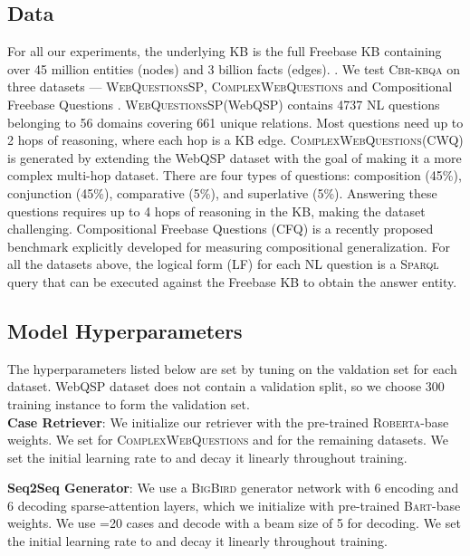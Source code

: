 \documentclass{article}
\newcommand{\roberta}{\textsc{Roberta}\xspace}
\newcommand{\bigb}{\textsc{BigBird}\xspace}
\newcommand{\webqsp}{\textsc{WebQuestionsSP}\xspace}
\newcommand{\cwq}{\textsc{ComplexWebQuestions}\xspace}
\newcommand{\alg}{\textsc{Cbr-kbqa}\xspace}
\begin{document}
\subsection{Data}
For all our experiments, the underlying KB is the full Freebase KB containing over 45 million entities (nodes) and 3 billion facts (edges). \cite{fb}. We test \alg on three datasets --- \webqsp \cite{yih2016value}, \cwq \cite{Talmor2018TheWA} and Compositional Freebase Questions \cite{keysers2020measuring}. \webqsp (WebQSP) contains 4737 NL questions belonging to 56 domains covering 661 unique relations. Most questions need up to 2 hops of reasoning, where each hop is a KB edge. \cwq (CWQ) is generated by extending the WebQSP dataset with the goal of making it a more complex multi-hop dataset. There are four types of questions: composition (45\%), conjunction (45\%), comparative (5\%), and superlative (5\%). Answering these questions requires up to 4 hops of reasoning in the KB, making the dataset challenging. Compositional Freebase Questions (CFQ) is a recently proposed benchmark explicitly developed for measuring compositional generalization. For all the datasets above, the logical form (LF) for each NL question is a \textsc{Sparql} query that can be executed against the Freebase KB to obtain the answer entity.


\subsection{Model Hyperparameters}
The hyperparameters listed below are set by tuning on the valdation set for each dataset. WebQSP dataset does not contain a validation split, so we choose 300 training instance to form the validation set.\\
\textbf{Case Retriever}: We initialize our retriever with the pre-trained \roberta-base weights. We set  for \cwq and  for the remaining datasets. We set the initial learning rate to  and decay it linearly throughout training.

\textbf{Seq2Seq Generator}: We use a \bigb generator network with 6 encoding and 6 decoding sparse-attention layers, which we initialize with pre-trained \textsc{Bart}-base weights. We use =20 cases and decode with a beam size of 5 for decoding. We set the initial learning rate to  and decay it linearly throughout training.
\end{document}
